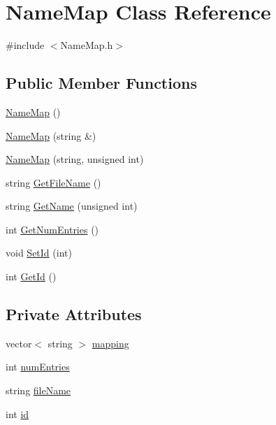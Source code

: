 \hypertarget{class_name_map}{
\section{NameMap Class Reference}
\label{class_name_map}
}


{\ttfamily \#include $<$NameMap.h$>$}

\subsection*{Public Member Functions}
\begin{DoxyCompactItemize}
\item 
\hyperlink{class_name_map_a8560d4570112d839b90be032f2af34e7}{NameMap} ()
\item 
\hyperlink{class_name_map_a62a8dd9a2c1cfda1101d28be1ba6aa7d}{NameMap} (string \&)
\item 
\hyperlink{class_name_map_a20ae2d9acb54e06016b9375fcc10d46a}{NameMap} (string, unsigned int)
\item 
string \hyperlink{class_name_map_a9b58a913f6abdda24ead4f56c36a75d4}{GetFileName} ()
\item 
string \hyperlink{class_name_map_a6cd400eef1ca62f1f9a0aea3876a0e41}{GetName} (unsigned int)
\item 
int \hyperlink{class_name_map_ab1922430c9e4d12e67b5f27edf9afd15}{GetNumEntries} ()
\item 
void \hyperlink{class_name_map_a61afb305b470bab4e3c9e14279d6f1c5}{SetId} (int)
\item 
int \hyperlink{class_name_map_a5ec2b743e894000de9dcc0c7cf198775}{GetId} ()
\end{DoxyCompactItemize}
\subsection*{Private Attributes}
\begin{DoxyCompactItemize}
\item 
vector$<$ string $>$ \hyperlink{class_name_map_a1acb823b1c1fb7b8d43f7e0e1406dca8}{mapping}
\item 
int \hyperlink{class_name_map_a647caae861e8a9e8472a033da6c0ad20}{numEntries}
\item 
string \hyperlink{class_name_map_acf6827aa9176aa0820a2c7c0ec0cf3a4}{fileName}
\item 
int \hyperlink{class_name_map_ab836a5099928fbf10c864504fd658fa8}{id}
\end{DoxyCompactItemize}


